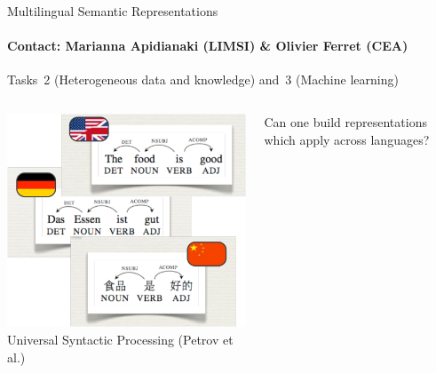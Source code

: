 \begin{frame}{Multilingual Semantic Representations}
\framesubtitle{Contact: Marianna Apidianaki (LIMSI) \& Olivier Ferret (CEA)}
Tasks~2 (Heterogeneous data and knowledge) and~3 (Machine learning)
\vfill

  \begin{columns}
    \begin{column}{5cm}
      \begin{center}
        \includegraphics[width=\linewidth]{Images/rsm-multilingual-parsing.png}\\
        Universal Syntactic Processing (Petrov et al.)
      \end{center}
    \end{column}
    \begin{column}{5cm}
      Can one build representations which apply across languages?
    \end{column}
  \end{columns}

\end{frame}

